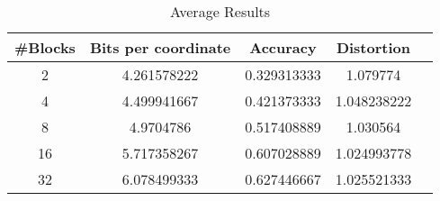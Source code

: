 \begin{table}[h!]
	\centering
	\caption{Average Results \clust{} \qsr{}}
	\label{table:avg_clust_qsr}
	\begin{tabular}{ccccc}
		\hline
		\#Blocks & Bits per coordinate & Accuracy  & Distortion \\ \hline
		2 & 4.261578222	& 0.329313333 & 1.079774  \\
		4 & 4.499941667 & 0.421373333 & 1.048238222  \\
		8 & 4.9704786 & 0.517408889 & 1.030564 \\
		16 & 5.717358267 & 0.607028889 & 1.024993778 \\
		32 & 6.078499333 & 0.627446667 & 1.025521333 \\
		\hline
	\end{tabular}
\end{table}
